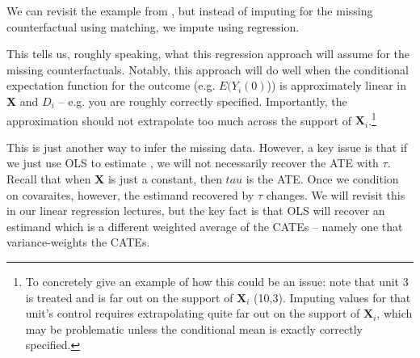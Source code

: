 \documentclass{tufte-handout}
\theoremstyle{break}
\newcommand{\bX}{\mathbf{X}}
\begin{document}
We can revisit the \citet{aronow2019foundations} example from , but instead of imputing for the missing counterfactual using matching, we impute using regression. 
 \begin{table*}
  \caption{Regression imputation in \citet{aronow2019foundations} example}
\end{table*}

This tells us, roughly speaking, what this regression approach will assume for the missing counterfactuals. Notably, this approach will do well when the conditional expectation function for the outcome (e.g. $E(Y_{i}(0)$)) is approximately linear in $\bX$ and $D_{i}$ -- e.g. you are roughly correctly specified. Importantly,  the approximation should not extrapolate too much across the support of $\mathbf{X}_{i}$.\footnote{To concretely give an example of how this could be an issue: note that unit $3$ is treated and is far out on the support of $\bX_{i}$ (10,3). Imputing values for that unit's control requires extrapolating quite far out on the support of $\bX_{i}$, which may be problematic unless the conditional mean is exactly correctly specified.} 

This is just another way to infer the missing data. However, a key issue is that if we just use OLS to estimate , we will not necessarily recover the ATE with $\tau$. Recall that when $\bX$ is just a constant, then $tau$ is the ATE. Once we condition on covaraites, however, the estimand recovered by $\tau$ changes. We will revisit this in our linear regression lectures, but the key fact is that OLS will recover an estimand which is a different weighted average of the CATEs -- namely one that variance-weights the CATEs. 
\end{document}
